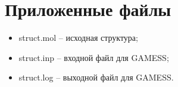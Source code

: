 \section{Приложенные файлы}
\begin{itemize}
    \item struct.mol – исходная структура;
    \item struct.inp – входной файл для GAMESS;
    \item struct.log – выходной файл для GAMESS.
\end{itemize}{}